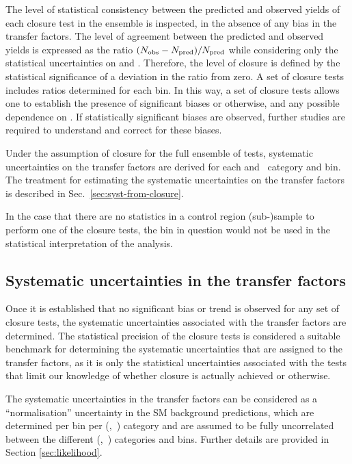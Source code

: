 The level of statistical consistency between the predicted and
observed yields of each closure test in the ensemble is inspected, in
the absence of any bias in the transfer factors. The level of
agreement between the predicted and observed yields is expressed as
the ratio $(N_{\textrm{obs}} - N_{\textrm{pred}})/N_{\textrm{pred}}$ while considering only the
statistical uncertainties on \npre and \nobs. Therefore, the level of
closure is defined by the statistical significance of a deviation in
the ratio from zero. A set of closure tests includes ratios determined
for each \scalht bin. In this way, a set of closure tests allows one to
establish the presence of significant biases or otherwise, and any
possible dependence on \scalht. If statistically significant biases
are observed, further studies are required to understand and correct
for these biases.

Under the assumption of closure for the full ensemble of tests,
systematic uncertainties on the transfer factors are derived for each
\njet and \nb~category and \scalht bin. The treatment for
estimating the systematic uncertainties on the transfer factors is
described in Sec.~\ref{sec:syst-from-closure}.

In the case that there are no statistics in a control region (sub-)sample
to perform one of the closure tests, the bin in question would not be 
used in the statistical interpretation of the analysis.


\subsection{Systematic uncertainties in the transfer factors\label{sec:syst-from-closure}}

Once it is established that no significant bias or trend is observed
for any set of closure tests, the systematic uncertainties associated
with the transfer factors are determined. The statistical precision of
the closure tests is considered a suitable benchmark for determining
the systematic uncertainties that are assigned to the transfer
factors, as it is only the statistical uncertainties associated with
the tests that limit our knowledge of whether closure is actually
achieved or otherwise.

The systematic uncertainties in the transfer factors can be considered
as a ``normalisation'' uncertainty in the SM background predictions,
which are determined per \scalht bin per (\njet,~\nb) category and are
assumed to be fully uncorrelated between the different (\njet,~\nb)
categories and \scalht bins. Further details are provided in Section
\ref{sec:likelihood}. 

